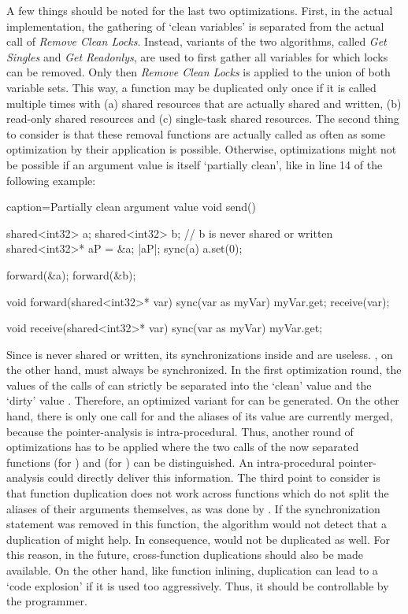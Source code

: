 A few things should be noted for the last two optimizations. First, in the actual implementation, the gathering of `clean variables' is separated from the actual call of \textit{Remove Clean Locks}. Instead, variants of the two algorithms, called \textit{Get Singles} and \textit{Get Readonlys}, are used to first gather all variables for which locks can be removed. Only then \textit{Remove Clean Locks} is applied to the union of both variable sets. This way, a function may be duplicated only once if it is called multiple times with (a) shared resources that are actually shared and written, (b) read-only shared resources and (c) single-task shared resources. The second thing to consider is that these removal functions are actually called as often as some optimization by their application is possible. Otherwise, optimizations might not be possible if an argument value is itself `partially clean', like  in line 14 of the following example:

\begin{ccode}{caption=Partially clean argument value}
void send() {
  shared<int32> a;
  shared<int32> b;          // b is never shared or written
  shared<int32>* aP = &a;
  |aP|;
  sync(a) { a.set(0); }
  
  forward(&a);
  forward(&b);
}

void forward(shared<int32>* var) {
  sync(var as myVar) { myVar.get; }
  receive(var);
}

void receive(shared<int32>* var) {
  sync(var as myVar) { myVar.get; }
}
\end{ccode} 

Since  is never shared or written, its synchronizations inside  and  are useless. , on the other hand, must always be synchronized. In the first optimization round, the values of the calls of  can strictly be separated into the `clean' value  and the `dirty' value . Therefore, an optimized variant for  can be generated. On the other hand, there is only one call for  and the aliases of its value are currently merged, because the pointer-analysis is intra-procedural. Thus, another round of optimizations has to be applied where the two calls of the now separated functions  (for ) and  (for ) can be distinguished. An intra-procedural pointer-analysis could directly deliver this information. The third point to consider is that function duplication does not work across functions which do not split the aliases of their arguments themselves, as was done by . If the synchronization statement was removed in this function, the algorithm would not detect that a duplication of  might help. In consequence,  would not be duplicated as well. For this reason, in the future, cross-function duplications should also be made available. On the other hand, like function inlining, duplication can lead to a `code explosion' if it is used too aggressively. Thus, it should be controllable by the programmer.

